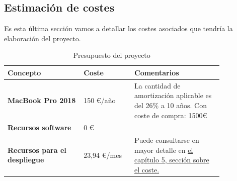 \subsection{Estimación de costes}
Es esta última sección vamos a detallar los costes asociados que tendría la elaboración
del proyecto.

\begin{table}[H]
\centering
    \begin{center}
        \begin{tabular}{| p{0.3\linewidth} | p{0.2\linewidth} | p{0.35\linewidth}|}
            \hline
            \rowcolor[HTML]{ECF4FF} 
            \textbf{Concepto} & \textbf{Coste} & \textbf{Comentarios} \\ \hline
            \textbf{MacBook Pro 2018} & 150 €/año & La cantidad de amortización aplicable es del 26\% a
        10 años. Con coste de compra: 1500€ \\
        \textbf{Recursos software} & 0 € &  \\
        \textbf{Recursos para el despliegue } & 23,94 €/mes & Puede consultarse en mayor
        detalle en \hyperref[sec:despliegue]{el capítulo 5, sección sobre el coste.}  \\
        \hline
        \end{tabular}
        \caption{Presupuesto del proyecto}
    \end{center}
\end{table}
